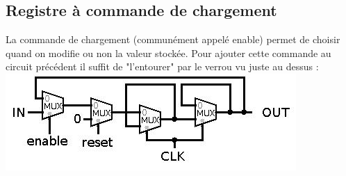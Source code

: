 \documentclass[10pt,a4paper]{article}
\begin{document}
\subsection{Registre à commande de chargement}
La commande de chargement (communément appelé enable) permet de choisir quand on modifie ou non la valeur stockée. Pour ajouter cette commande au circuit précédent il suffit de "l'entourer" par le verrou vu juste au dessus :
\includegraphics[scale=0.5]{registre1bit.jpg} 
\end{document}
